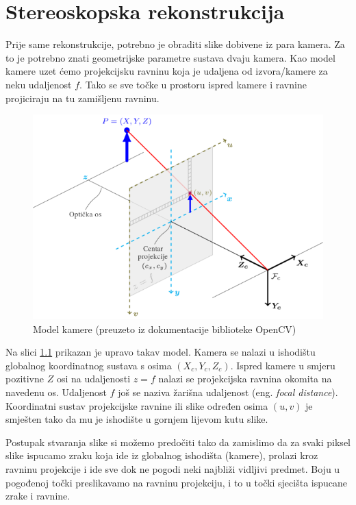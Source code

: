 \documentclass[utf8, zavrsni, numeric]{fer}
\begin{document}
\chapter{Stereoskopska rekonstrukcija}

Prije same rekonstrukcije, potrebno je obraditi slike dobivene iz para kamera. Za to je potrebno znati geometrijske parametre sustava dvaju kamera. Kao model kamere uzet ćemo
projekcijsku ravninu koja je udaljena od izvora/kamere za neku udaljenost $f$. Tako se sve točke u prostoru ispred kamere i ravnine projiciraju na tu zamišljenu ravninu.

\begin{figure}[htb]
  \centering
  \includegraphics[width=13cm]{img/pinhole_camera_model.png}
  \caption{Model kamere (preuzeto iz dokumentacije biblioteke OpenCV)}
  \label{fig:model-kamere}
\end{figure}

Na slici \ref{fig:model-kamere} prikazan je upravo takav model. Kamera se nalazi u ishodištu
globalnog koordinatnog sustava s osima $(X_c, Y_c, Z_c)$. Ispred kamere u smjeru pozitivne
$Z$ osi na udaljenosti $z = f$ nalazi se projekcijska ravnina okomita na navedenu os. Udaljenost $f$ još se naziva žarišna udaljenost (eng. {\sl focal distance}). Koordinatni sustav projekcijske ravnine
ili slike određen osima $(u, v)$ je smješten tako da mu je ishodište u gornjem lijevom kutu slike.

Postupak stvaranja slike si možemo predočiti tako da zamislimo da za svaki piksel slike ispucamo
zraku koja ide iz globalnog ishodišta (kamere), prolazi kroz ravninu projekcije i ide sve dok ne pogodi neki najbliži vidljivi predmet. Boju u pogođenoj točki preslikavamo na ravninu projekciju, i to u točki sjecišta ispucane zrake i ravnine.
\end{document}
